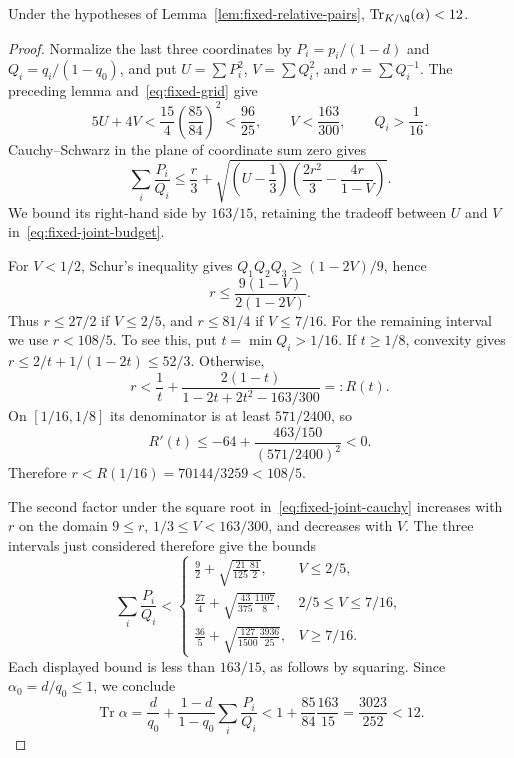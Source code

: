 \begin{lemma}\label{lem:fixed-small-trace}
Under the hypotheses of Lemma~\ref{lem:fixed-relative-pairs},
$\operatorname{Tr}_{K/\Q}(\alpha)<12$.
\end{lemma}
\begin{proof}
Normalize the last three coordinates by
$P_i=p_i/(1-d)$ and $Q_i=q_i/(1-q_0)$, and put
$U=\sum P_i^2$, $V=\sum Q_i^2$, and $r=\sum Q_i^{-1}$.
The preceding lemma and~\eqref{eq:fixed-grid} give
\begin{equation}\label{eq:fixed-joint-budget}
 5U+4V<\frac{15}{4}\left(\frac{85}{84}\right)^2
 <\frac{96}{25},\qquad V<\frac{163}{300},\qquad Q_i>\frac1{16}.
\end{equation}
Cauchy--Schwarz in the plane of coordinate sum zero gives
\begin{equation}\label{eq:fixed-joint-cauchy}
 \sum_i\frac{P_i}{Q_i}
 \le\frac r3+\sqrt{\left(U-\frac13\right)
              \left(\frac{2r^2}{3}-\frac{4r}{1-V}\right)}.
\end{equation}
We bound its right-hand side by $163/15$, retaining the tradeoff
between $U$ and $V$ in~\eqref{eq:fixed-joint-budget}.

For $V<1/2$, Schur's inequality gives
$Q_1Q_2Q_3\ge(1-2V)/9$, hence
\[
 r\le\frac{9(1-V)}{2(1-2V)}.
\]
Thus $r\le27/2$ if $V\le2/5$, and $r\le81/4$ if
$V\le7/16$.
For the remaining interval we use $r<108/5$. To see this, put
$t=\min Q_i>1/16$. If $t\ge1/8$, convexity gives
$r\le2/t+1/(1-2t)\le52/3$. Otherwise,
\[
 r<\frac1t+\frac{2(1-t)}{1-2t+2t^2-163/300}=:R(t).
\]
On $[1/16,1/8]$ its denominator is at least $571/2400$, so
\[
 R'(t)\le-64+
 \frac{463/150}{(571/2400)^2}<0.
\]
Therefore $r<R(1/16)=70144/3259<108/5$.

The second factor under the square root
in~\eqref{eq:fixed-joint-cauchy} increases with $r$ on the domain
$9\le r$, $1/3\le V<163/300$, and decreases with $V$.
The three intervals just considered therefore give the bounds
\[
 \sum_i\frac{P_i}{Q_i}<
 \begin{cases}
 \displaystyle\frac92+\sqrt{\frac{21}{125}\frac{81}{2}},
     &V\le2/5,\\[4pt]
 \displaystyle\frac{27}{4}+\sqrt{\frac{43}{375}\frac{1107}{8}},
     &2/5\le V\le7/16,\\[4pt]
 \displaystyle\frac{36}{5}+\sqrt{\frac{127}{1500}\frac{3936}{25}},
     &V\ge7/16.
 \end{cases}
\]
Each displayed bound is less than $163/15$, as follows by squaring.
Since $\alpha_0=d/q_0\le1$, we conclude
\[
 \operatorname{Tr}\alpha
 =\frac d{q_0}+\frac{1-d}{1-q_0}\sum_i\frac{P_i}{Q_i}
 <1+\frac{85}{84}\frac{163}{15}
 =\frac{3023}{252}<12.
\]
\end{proof}



